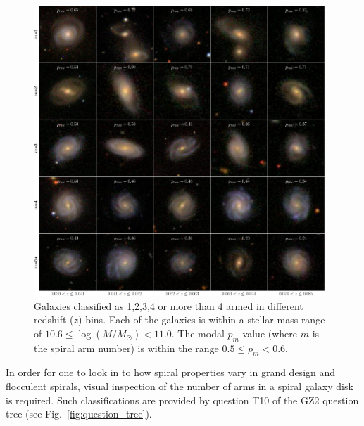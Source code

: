 \documentclass[useAMS,usenatbib]{mn2e}
\begin{document}
\begin{figure}
		\centering

        \includegraphics[width=0.975\textwidth]{Images/Results/image_page_p0506_m106110.pdf}

        \caption{Galaxies classified as 1,2,3,4 or more than 4 armed in different redshift ($z$) bins. Each of the galaxies is within a stellar mass range of $10.6 \leq \log(M/M_{\odot}) < 11.0$. The modal $p_m$ value (where $m$ is the spiral arm number) is within the range $0.5 \leq p_m < 0.6$.}

        \label{fig:image_panel}

\end{figure}

In order for one to look in to how spiral properties vary in grand design and flocculent spirals, visual inspection of the number of arms in a spiral galaxy disk is required. Such classifications are provided by question T10 of the GZ2 question tree (see Fig.~\ref{fig:question_tree}). 
\end{document}

